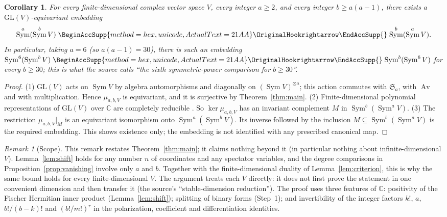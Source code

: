 \documentclass[11pt]{article}
\renewcommand{\hookrightarrow}{\mathrel{
  \BeginAccSupp{method=hex,unicode,ActualText=21AA}
  \OriginalHookrightarrow\EndAccSupp{}}}
\newtheorem{corollary}[theorem]{Corollary}
\theoremstyle{remark}
\newtheorem{remark}[theorem]{Remark}
\DeclareMathOperator{\Sym}{Sym}
\DeclareMathOperator{\Av}{Av}
\newcommand{\C}{\mathbb C}
\newcommand{\Sa}{\mathfrak S_a}
\begin{document}
\begin{corollary}\label{cor:comparison}
For every finite-dimensional complex vector space $V$, every integer
$a\ge2$, and every integer $b\ge a(a-1)$, there exists a
$\mathrm{GL}(V)$-equivariant embedding
\[
 \Sym^a(\Sym^b V)\hookrightarrow\Sym^b(\Sym^a V).
\]
In particular, taking $a=6$ (so $a(a-1)=30$), there is such an embedding
$\Sym^6(\Sym^bV)\hookrightarrow\Sym^b(\Sym^6V)$ for every $b\ge30$; this is
what the source calls ``the sixth symmetric-power comparison for
$b\ge30$''.
\end{corollary}

\begin{proof}
(1) $\mathrm{GL}(V)$ acts on $\Sym V$ by algebra automorphisms and
diagonally on $(\Sym V)^{\otimes a}$; this action commutes with $\Sa$, with
$\Av$ and with multiplication. Hence $\mu_{a,b,V}$ is equivariant, and it is
surjective by Theorem~\ref{thm:main}.
(2) Finite-dimensional polynomial representations of $\mathrm{GL}(V)$ over
$\C$ are completely reducible
\cite[Chapter~I, Appendix~A, Sections~7--8]{Macdonald}. So
$\ker\mu_{a,b,V}$ has an invariant complement $M$ in $\Sym^b(\Sym^aV)$.
(3) The restriction $\mu_{a,b,V}|_M$ is an equivariant isomorphism onto
$\Sym^a(\Sym^b V)$. Its inverse followed by the inclusion
$M\subseteq\Sym^b(\Sym^a V)$ is the required embedding.
This shows existence only; the embedding is not identified with any
prescribed canonical map.
\end{proof}

\begin{remark}[Scope]\label{rem:scope}
This remark restates Theorem~\ref{thm:main}; it claims nothing beyond it
(in particular nothing about infinite-dimensional $V$).
Lemma~\ref{lem:shift} holds for any number $n$ of coordinates and any
spectator variables, and the degree comparisons in
Proposition~\ref{prop:vanishing} involve only $a$ and $b$. Together with
the finite-dimensional duality of Lemma~\ref{lem:criterion}, this is why the
same bound holds for every finite-dimensional $V$. The argument treats each
$V$ directly: it does not first prove the statement in one convenient
dimension and then transfer it (the source's ``stable-dimension
reduction''). The proof uses three features of $\C$: positivity of the
Fischer Hermitian inner product (Lemma~\ref{lem:shift}); splitting of
binary forms (Step~1); and invertibility of the integer factors $k!$, $a$,
$b!/(b-k)!$ and $(b!/m!)^r$ in the polarization, coefficient and
differentiation identities.
\end{remark}
\end{document}
